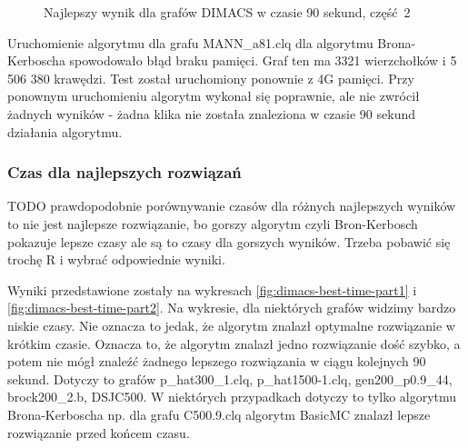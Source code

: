 \documentclass[12pt, a4paper]{article}
\begin{document}
\begin{figure}[H]
  \begin{center}
  \end{center}
  \caption{Najlepszy wynik dla grafów DIMACS w czasie 90 sekund, część 2}
  \label{fig:dimacs-best-part2}
\end{figure}

Uruchomienie algorytmu dla grafu MANN\_a81.clq dla algorytmu Brona-Kerboscha spowodowało błąd braku pamięci. Graf ten ma 3321 wierzchołków i 5 506 380 krawędzi. Test został uruchomiony ponownie z 4G pamięci. Przy ponownym uruchomieniu algorytm wykonał się poprawnie, ale nie zwrócił żadnych wyników - żadna klika nie została znaleziona w czasie 90 sekund działania algorytmu.

\subsubsection{Czas dla najlepszych rozwiązań}
TODO prawdopodobnie porównywanie czasów dla różnych najlepszych wyników to nie jest najlepsze rozwiązanie, bo gorszy algorytm czyli Bron-Kerbosch pokazuje lepsze czasy ale są to czasy dla gorszych wyników. Trzeba pobawić się trochę R i wybrać odpowiednie wyniki.

Wyniki przedstawione zostały na wykresach \ref{fig:dimacs-best-time-part1} i \ref{fig:dimacs-best-time-part2}. Na wykresie, dla niektórych grafów widzimy bardzo niskie czasy. Nie oznacza to jedak, że algorytm znalazł optymalne rozwiązanie w krótkim czasie. Oznacza to, że algorytm znalazł jedno rozwiązanie dość szybko, a potem nie mógł znaleźć żadnego lepszego rozwiązania w ciągu kolejnych 90 sekund. Dotyczy to grafów 
p\_hat300\_1.clq, p\_hat1500-1.clq, gen200\_p0.9\_44, brock200\_2.b, DSJC500. W niektórych przypadkach dotyczy to tylko algorytmu Brona-Kerboscha np. dla grafu C500.9.clq algorytm BasicMC znalazł lepsze rozwiązanie przed końcem czasu.
\end{document}
